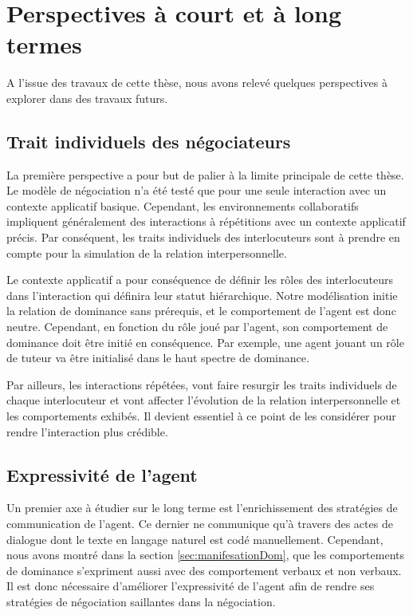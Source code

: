 \section{Perspectives à court et à long termes}

	A l’issue des travaux de cette thèse, nous avons relevé quelques perspectives à explorer dans des travaux futurs.		
	
	\subsection{Trait individuels des négociateurs}
		La première perspective a pour but de palier à la limite principale de cette thèse. Le modèle de négociation n'a été testé que pour une seule interaction avec un contexte applicatif basique. Cependant, les environnements collaboratifs impliquent généralement des interactions à répétitions avec un contexte applicatif précis. Par conséquent, les traits individuels des interlocuteurs sont à prendre en compte pour la simulation de la relation interpersonnelle. 
		
		Le contexte applicatif a pour conséquence de définir les rôles des interlocuteurs dans l'interaction qui définira leur statut hiérarchique. Notre modélisation initie la relation de dominance sans prérequis, et le comportement de l'agent est donc neutre. Cependant, en fonction du rôle joué par l'agent, son comportement de dominance doit être initié en conséquence. Par exemple, une agent jouant un rôle de tuteur va être initialisé dans le haut spectre de dominance. 
		
		Par ailleurs, les interactions répétées, vont faire resurgir les traits individuels de chaque interlocuteur et vont affecter l'évolution de la relation interpersonnelle et les comportements exhibés. Il devient essentiel à ce point de les considérer pour rendre l'interaction plus crédible.	
	
	\subsection{Expressivité de l'agent}
		Un premier axe à étudier sur le long terme est l'enrichissement des stratégies de communication de l'agent. Ce dernier ne communique qu'à travers des actes de dialogue dont le texte en langage naturel est codé manuellement. Cependant, nous avons montré dans la section \ref{sec:manifesationDom}, que les comportements de dominance s'expriment aussi avec des comportement verbaux et non verbaux.
		Il est donc nécessaire d'améliorer l'expressivité de l'agent afin de rendre ses stratégies de négociation saillantes dans la négociation. 
	
